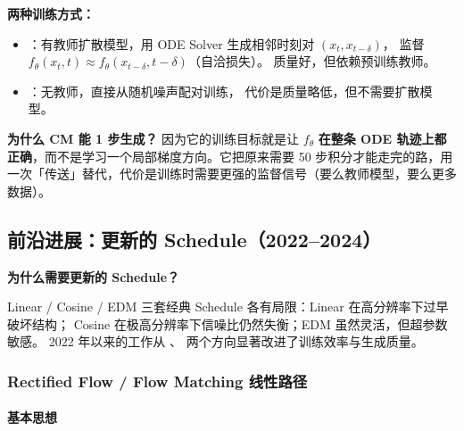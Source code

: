 \begin{conceptbox}
\textbf{两种训练方式：}
\begin{itemize}
  \item {}：有教师扩散模型，用 ODE Solver 生成相邻时刻对 $(x_t, x_{t-\delta})$，
        监督 $f_\theta(x_t,t) \approx f_\theta(x_{t-\delta}, t-\delta)$（自洽损失）。
        质量好，但依赖预训练教师。
  \item {}：无教师，直接从随机噪声配对训练，
        代价是质量略低，但不需要扩散模型。
\end{itemize}

\textbf{为什么 CM 能 1 步生成？} 因为它的训练目标就是让 $f_\theta$ \textbf{在整条 ODE 轨迹上都正确}，而不是学习一个局部梯度方向。它把原来需要 50 步积分才能走完的路，用一次「传送」替代，代价是训练时需要更强的监督信号（要么教师模型，要么更多数据）。
\end{conceptbox}

\medskip
{}

\subsection{前沿进展：更新的 Schedule（2022--2024）}

\begin{intubox}
\textbf{为什么需要更新的 Schedule？}

Linear / Cosine / EDM 三套经典 Schedule 各有局限：Linear 在高分辨率下过早破坏结构；
Cosine 在极高分辨率下信噪比仍然失衡；EDM 虽然灵活，但超参数敏感。
2022 年以来的工作从 、 两个方向显著改进了训练效率与生成质量。
\end{intubox}

\subsubsection{Rectified Flow / Flow Matching 线性路径}

\paragraph{基本思想}

